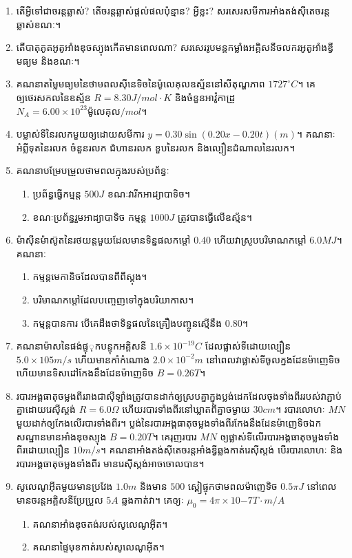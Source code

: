 \documentclass{officialexam}
\begin{document}
\begin{enumerate}[I]
	\item តើអ្វីទៅជាចរន្តឆ្លាស់? តើចរន្តឆ្លាស់ផ្តល់ផលប៉ុន្មាន? អ្វីខ្លះ? សរសេរសមីការអាំងតង់សុីតេចរន្តឆ្លាស់ខណៈ។
	\item តើបាតុភូតអូតូអាំងឌុចស្យុងកើតមានពេលណា? សរសេររូបមន្តកម្លាំងអគ្គិសនីចលករអូតូអាំងឌ្វីមធ្យម និងខណៈ។
	\item គណនាតម្លៃមធ្យមនៃថាមពលសុីនេទិចនៃម៉ូលេគុលឧស្ម័ននៅសីតុណ្ហភាព $1727^\circ C$។ គេឲ្យថេរសកលនៃឧស្ម័ន $R=8.30J/mol\cdot K$ និងចំនួនអាវ៉ូកាដ្រូ $N_{A}=6.00\times10^{23}\text{ម៉ូលេគុល}/mol$។
	\item បម្លាស់ទីនៃរលកមួយឲ្យដោយសមីការ $y=0.30\sin\left(0.20x-0.20t\right)\left(m\right)$។ គណនាៈ\\
	អំព្លីទុតនៃរលក ចំនួនរលក ជំហានរលក ខួបនៃរលក និងល្បឿនដំណាលនៃរលក។
	\item គណនាបម្រែបម្រួលថាមពលក្នុងរបស់ប្រព័ន្ធៈ
	\begin{enumerate}[k]
		\item ប្រព័ន្ធធ្វើកម្មន្ត $500J$ ខណៈវារីកអាដ្យាបាទិច។
		\item ខណៈប្រព័ន្ធរួមអាដ្យាបាទិច កម្មន្ត $1000J$ ត្រូវបានធ្វើលើឧស្ម័ន។
	\end{enumerate} 
	\item ម៉ាសុីនម៉ាស៊ូតនៃរថយន្តមួយដែលមានទិន្នផលកម្តៅ $0.40$ ហើយវាស្រូបបរិមាណកម្តៅ $6.0MJ$។ គណនាៈ
	\begin{enumerate}[k]
		\item កម្មន្តមេកានិចដែលបានពីពីស្តុង។
		\item បរិមាណកម្តៅដែលបញ្ចេញទៅក្នុងបរិយាកាស។
		\item កម្មន្តបានការ បើគេដឹងថាទិន្នផលនៃគ្រឿងបញ្ចូនស្មើនឹង $0.80$។
	\end{enumerate}
	\item គណនាម៉ាសនៃផង់ផ្ទុុកបន្ទុកអគ្គិសនី $1.6\times10^{-19}C$ ដែលផ្លាស់ទីដោយល្បឿន $5.0\times10{5}m/s$ ហើយមានកាំកំណោង $2.0\times10^{-2}m$ នៅពេលវាផ្លាស់ទីចូលក្នងដែនម៉ាញេទិច ហើយមានទិសដៅកែងនឹងដែនម៉ាញេទិច $B=0.26T$។
	\item របារអង្គធាតុចម្លងពីររាងជាសុីឡាំងត្រូវបានដាក់ឲ្យស្របគ្នាក្នុងប្លង់ដេកដែលចុងទាំងពីររបស់វាភ្ជាប់គ្នាដោយរេសុីស្តង់ $R=6.0\Omega$ ហើយរបារទាំងពីរនៅឃ្លាតពីគ្នាចម្ងាយ $30cm$។ របារលោហៈ $MN$ មួយដាក់ឲ្យកែងលើរបារទាំងពីរ។ ប្លង់នៃរបារអង្គធាតុចម្លងទាំងពីរកែងនឹងដែនម៉ាញេទិចឯកសណ្ឋានមានអាំងឌុចស្យុង $B=0.20T$។ គេរុញរបារ $MN$ ឲ្យផ្លាស់ទីលើរបារអង្គធាតុចម្លងទាំងពីរដោយល្បឿន $10m/s$។ គណនាអាំងតង់សុីតេចរន្តអាំងឌ្វីឆ្លងកាត់រេសុីស្តង់ បើរបារលោហៈ និងរបារអង្គធាតុចម្លងទាំងពីរ មានរេសុីស្តង់អាចចោលបាន។
	\item សូលេណូអុីតមួយមានប្រវែង $1.0m$ និងមាន $500$ ស្ពៀផ្ទុកថាមពលម៉ាញេទិច $0.5\pi J$ នៅពេលមានចរន្តអគ្គិសនីប្រែប្រួល $5A$ ឆ្លងកាត់វា។ គេឲ្យៈ $\mu_{0}=4\pi\times10{-7}T\cdot m/A$
	\begin{enumerate}[k]
		\item គណនាអាំងឌុចតង់របស់សូលេណូអុីត។
		\item គណនាផ្ទៃមុខកាត់របស់សូលេណូអុីត។
	\end{enumerate}
\end{enumerate}
\end{document}
